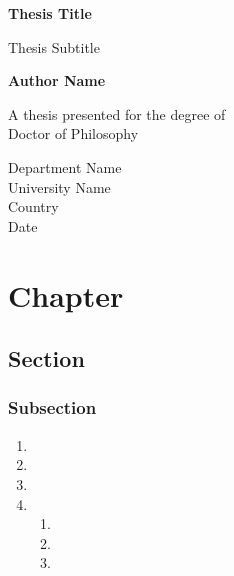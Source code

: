 \documentclass[draft,xelatex]{G7-32-2017}
\begin{document}
\begin{titlepage}
    \begin{center}
        \vspace*{1cm}

        \textbf{Thesis Title}

        \vspace{0.5cm}
            Thesis Subtitle
                
        \vspace{1.5cm}

        \textbf{Author Name}

        \vfill
                
        A thesis presented for the degree of\\
        Doctor of Philosophy
                
        \vspace{0.8cm}
                
        Department Name\\
        University Name\\
        Country\\
        Date
    \end{center}
\end{titlepage}

\tableofcontents

\frontmatter

\Introduction

\lipsum[1-4]

\mainmatter

\chapter{Chapter}

\section{Section}

\subsection{Subsection}

\lipsum

\begin{enumerate}
    \item \lipsum[1][1-2]
    \item \lipsum[1][3-4]
    \item \lipsum[1][5-6]
    \item 
    \begin{enumerate}
        \item \lipsum[2][1]
        \item \lipsum[2][2]
        \item \lipsum[2][3]
    \end{enumerate}
\end{enumerate}
\end{document}

